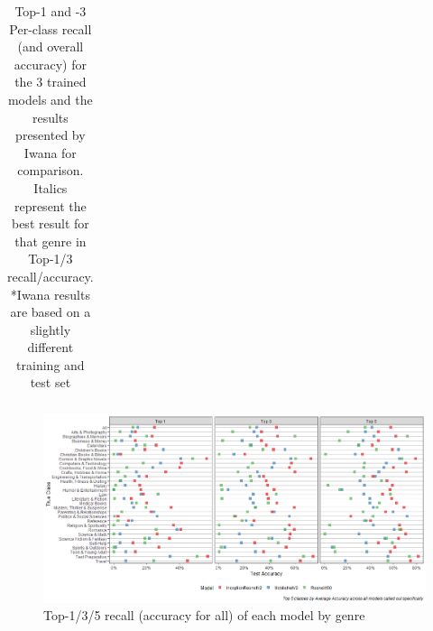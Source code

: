 \documentclass[12pt]{article}
\numberwithin{equation}{section}
\numberwithin{figure}{section}
\begin{document}
\begin{table}[]
{\begin{tabular}{lrrrrrrrrrrrrrr}
	\end{tabular}%
	}
	\caption{Top-1 and -3 Per-class recall (and overall accuracy) for the 3 trained models and the results presented by Iwana for comparison. Italics represent the best result for that genre in Top-1/3 recall/accuracy. \\
	\tiny{*Iwana results are based on a slightly different training and test set}
	}
	\label{tab:results_acc}
	\end{table}


\begin{figure}
	\centering
	\captionsetup{justification=centering}
	\includegraphics[scale=0.5]{accuracy_by_model.png}
	\caption{Top-1/3/5 recall (accuracy for all) of each model by genre}
	\label{fig:test_perf}
\end{figure}
\end{document}
